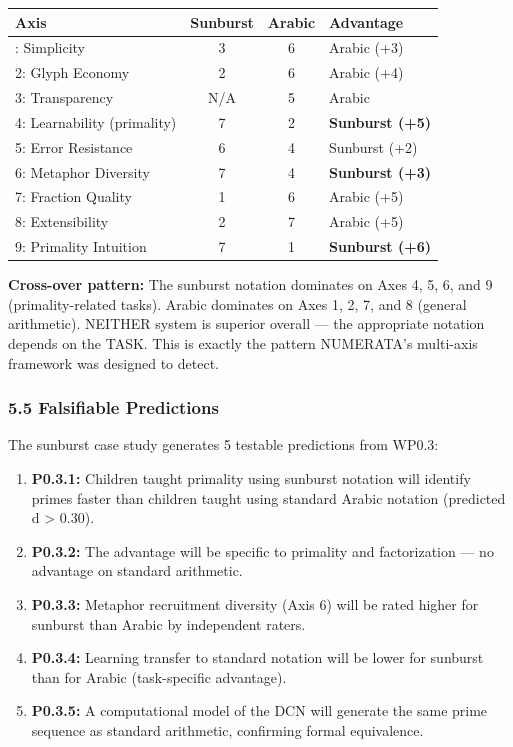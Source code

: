 \documentclass[
]{article}
\newcounter{none} %
\providecommand{\tightlist}{%
  \setlength{\itemsep}{0pt}\setlength{\parskip}{0pt}}
\begin{document}
{\def\LTcaptype{none} %
\begin{longtable}[]{@{}lccl@{}}
\toprule\noalign{}
Axis & Sunburst & Arabic & Advantage \\
\midrule\noalign{}
\endhead
\bottomrule\noalign{}
\endlastfoot
1: Simplicity & 3 & 6 & Arabic (+3) \\
2: Glyph Economy & 2 & 6 & Arabic (+4) \\
3: Transparency & N/A & 5 & Arabic \\
4: Learnability (primality) & 7 & 2 & \textbf{Sunburst (+5)} \\
5: Error Resistance & 6 & 4 & Sunburst (+2) \\
6: Metaphor Diversity & 7 & 4 & \textbf{Sunburst (+3)} \\
7: Fraction Quality & 1 & 6 & Arabic (+5) \\
8: Extensibility & 2 & 7 & Arabic (+5) \\
9: Primality Intuition & 7 & 1 & \textbf{Sunburst (+6)} \\
\end{longtable}
}

\textbf{Cross-over pattern:} The sunburst notation dominates on Axes 4,
5, 6, and 9 (primality-related tasks). Arabic dominates on Axes 1, 2, 7,
and 8 (general arithmetic). NEITHER system is superior overall --- the
appropriate notation depends on the TASK. This is exactly the pattern
NUMERATA's multi-axis framework was designed to detect.

\subsubsection{5.5 Falsifiable
Predictions}\label{falsifiable-predictions}

The sunburst case study generates 5 testable predictions from WP0.3:

\begin{enumerate}
\def\labelenumi{\arabic{enumi}.}
\tightlist
\item
  \textbf{P0.3.1:} Children taught primality using sunburst notation
  will identify primes faster than children taught using standard Arabic
  notation (predicted d \textgreater{} 0.30).
\item
  \textbf{P0.3.2:} The advantage will be specific to primality and
  factorization --- no advantage on standard arithmetic.
\item
  \textbf{P0.3.3:} Metaphor recruitment diversity (Axis 6) will be rated
  higher for sunburst than Arabic by independent raters.
\item
  \textbf{P0.3.4:} Learning transfer to standard notation will be lower
  for sunburst than for Arabic (task-specific advantage).
\item
  \textbf{P0.3.5:} A computational model of the DCN will generate the
  same prime sequence as standard arithmetic, confirming formal
  equivalence.
\end{enumerate}
\end{document}
